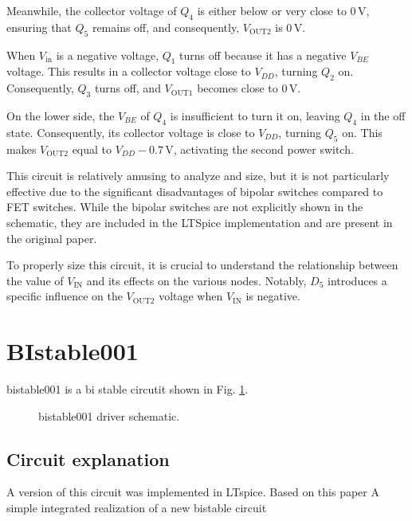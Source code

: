 \documentclass[12pt]{article}
\begin{document}
Meanwhile, the collector voltage of $Q_4$ is either below or very close to $0 \, \text{V}$, ensuring that $Q_5$ remains off, and consequently, $V_{\text{OUT2}}$ is $0 \, \text{V}$.  

When $V_{\text{in}}$ is a negative voltage, $Q_1$ turns off because it has a negative $V_{BE}$ voltage. This results in a collector voltage close to $V_{DD}$, turning $Q_2$ on. Consequently, $Q_3$ turns off, and $V_{\text{OUT1}}$ becomes close to $0 \, \text{V}$.  

On the lower side, the $V_{BE}$ of $Q_4$ is insufficient to turn it on, leaving $Q_4$ in the off state. Consequently, its collector voltage is close to $V_{DD}$, turning $Q_5$ on. This makes $V_{\text{OUT2}}$ equal to $V_{DD} - 0.7 \, \text{V}$, activating the second power switch.

This circuit is relatively amusing to analyze and size, but it is not particularly effective due to the significant disadvantages of bipolar switches compared to FET switches. While the bipolar switches are not explicitly shown in the schematic, they are included in the LTSpice implementation and are present in the original paper.  

To properly size this circuit, it is crucial to understand the relationship between the value of $V_{\text{IN}}$ and its effects on the various nodes. Notably, $D_5$ introduces a specific influence on the $V_{\text{OUT2}}$ voltage when $V_{\text{IN}}$ is negative.  





\section{BIstable001}



bistable001 is a bi stable circutit shown in Fig. \ref{bistable001}. 

\begin{figure}[H]
        \centering
        
        \caption{bistable001 driver schematic.}
        \label{bistable001}
\end{figure}

\subsection{Circuit explanation}

A version of this circuit was implemented in LTspice.  
Based on this paper A simple integrated realization of a new bistable circuit
\end{document}
